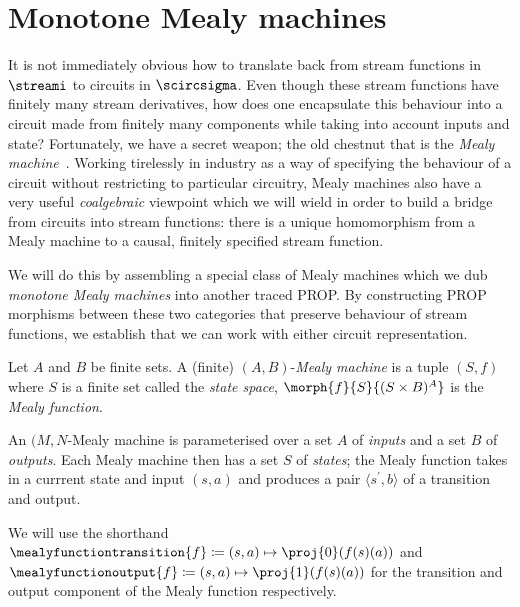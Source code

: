 \section{Monotone Mealy machines}

It is not immediately obvious how to translate back from stream functions in
\(\streami\) to circuits in \(\scircsigma\).
Even though these stream functions have finitely many stream derivatives, how
does one encapsulate this behaviour into a circuit made from finitely many
components while taking into account inputs and state?
Fortunately, we have a secret weapon; the old chestnut that is the
\emph{Mealy machine}~\cite{mealy1955method}.
Working tirelessly in industry as a way of specifying the behaviour of a
circuit without restricting to particular circuitry, Mealy machines also have
a very useful \emph{coalgebraic} viewpoint which we will wield in order to
build a bridge from circuits into stream functions: there is a unique
homomorphism from a Mealy machine to a causal, finitely specified stream
function.

We will do this by assembling a special class of Mealy machines which we dub
\emph{monotone Mealy machines} into another traced PROP.
By constructing PROP morphisms between these two categories that preserve
behaviour of stream functions, we establish that we can work with either
circuit representation.

\begin{definition}\label{def:mealy}
    Let \(A\) and \(B\) be finite sets.
    A (finite) \((A,B)\)-\emph{Mealy machine} is a tuple \((S, f)\) where
    \(S\) is a finite set called the \emph{state space},
    \(\morph{f}{S}{(S \times B)^A}\) is the \emph{Mealy function}.
\end{definition}

An \((M,N\)-Mealy machine is parameterised over a set \(A\) of \emph{inputs} and
a set \(B\) of \emph{outputs}.
Each Mealy machine then has a set \(S\) of \emph{states}; the Mealy function
takes in a currrent state and input \((s, a)\) and produces a pair
\(\langle{s^\prime, b}\rangle\) of a transition and output.

\begin{notation}
    We will use the shorthand \(
    \mealyfunctiontransition{f} \coloneqq (s, a) \mapsto \proj{0}(f(s)(a))
\) and \(
    \mealyfunctionoutput{f} \coloneqq (s, a) \mapsto \proj{1}(f(s)(a))
\) for the transition and output component of the Mealy function respectively.
\end{notation}

